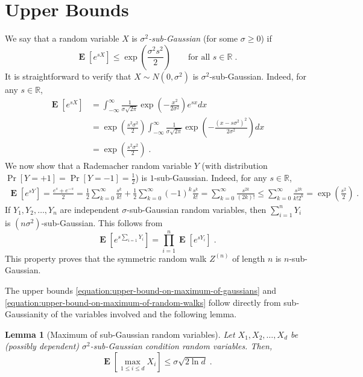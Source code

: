 \documentclass{article}
\DeclareMathOperator*{\Exp}{\mathbf{E}}
\newcommand{\field}[1]{\mathbb{#1}}
\newcommand{\R}{\field{R}}
\newtheorem{lemma}[theorem]{Lemma}
\begin{document}



\appendix

\section{Upper Bounds}
\label{section:upper-bounds}

We say that a random variable $X$ is \emph{$\sigma^2$-sub-Gaussian} (for some $\sigma \ge 0$) if
\begin{equation}
\label{equation:sigma-sub-gaussian}
\Exp \left[ e^{sX} \right] \le \exp\left( \frac{\sigma^2 s^2}{2} \right) \qquad \text{for all $s \in \R$} \; .
\end{equation}
It is straightforward to verify that $X \sim N(0,\sigma^2)$ is $\sigma^2$-sub-Gaussian. Indeed, for any $s \in \R$,
\begin{align*}
\Exp \left[ e^{sX} \right]
& = \int_{-\infty}^\infty \frac{1}{\sigma \sqrt{2\pi}} \exp\left( - \frac{x^2}{2\sigma^2} \right) e^{sx} dx \\
& = \exp\left( \frac{s^2\sigma^2}{2} \right) \int_{-\infty}^\infty \frac{1}{\sigma \sqrt{2\pi}} \exp\left( - \frac{(x - s\sigma^2)^2}{2\sigma^2} \right) dx \\
& = \exp\left( \frac{s^2\sigma^2}{2} \right) \; .
\end{align*}
We now show that a Rademacher random variable $Y$ (with distribution $\Pr[Y = +1] = \Pr[Y=-1] = \frac{1}{2}$)
is $1$-sub-Gaussian. Indeed, for any $s \in \R$,
\begin{align*}
\Exp \left[ e^{sY} \right]
= \frac{e^{s} + e^{-s}}{2}
= \frac{1}{2}\sum_{k=0}^\infty \frac{s^k}{k!}
+ \frac{1}{2}\sum_{k=0}^\infty (-1)^k \frac{s^k}{k!}
= \sum_{k=0}^\infty \frac{s^{2k}}{(2k)!}
\le \sum_{k=0}^\infty \frac{s^{2k}}{k! 2^k}
= \exp\left( \frac{s^2}{2} \right) \; .
\end{align*}
If $Y_1, Y_2, \dots, Y_n$ are independent $\sigma$-sub-Gaussian random variables, then $\sum_{i=1}^n Y_i$ is $(n\sigma^2)$-sub-Gaussian.
This follows from
$$
\Exp \left[ e^{s \sum_{i=1} Y_i} \right] = \prod_{i=1}^n \Exp \left[ e^{sY_i} \right] \; .
$$
This property proves that the symmetric random walk $Z^{(n)}$ of length $n$ is $n$-sub-Gaussian.

The upper bounds \eqref{equation:upper-bound-on-maximum-of-gaussians} and
\eqref{equation:upper-bound-on-maximum-of-random-walks} follow directly from
sub-Gaussianity of the variables involved and the following lemma.

\begin{lemma}[Maximum of sub-Gaussian random variables]
Let $X_1, X_2, \dots, X_d$ be (possibly dependent) $\sigma^2$-sub-Gaussian condition random variables.
Then,
$$
\Exp\left[ \max_{1 \le i \le d} X_i \right] \le \sigma \sqrt{2 \ln d} \; .
$$
\end{lemma}
\end{document}

